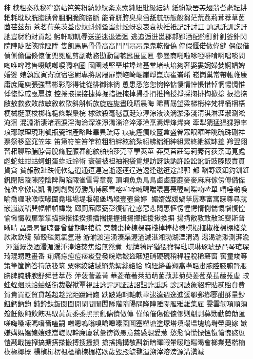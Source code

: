 秣秧租秦秩秘窄窈站笆笑粉紡紗紋紊素索純紐紕級紜納
紙紛缺罟羔翅翁耆耄耘耕耙耗耽耿胱脂胰脅胭胴脆胸胳脈
能脊胼胯臭臬舀舐航舫舨般芻茫荒荔荊茸荐草茵茴荏茲茹
茶茗荀茱茨荃虔蚊蚪蚓蚤蚩蚌蚣蚜衰衷袁袂衽衹記訐討訌
訕訊託訓訖訏訑豈豺豹財貢起躬軒軔軏辱送逆迷退迺迴
逃追逅迸邕郡郝郢酒配酌釘針釗釜釙閃院陣陡陛陝除陘陞
隻飢馬⾺骨⾻高⾼⾾鬥鬲⿀鬼⿁乾偺偽停假偃偌做偉健
偶偎偕偵側偷偏倏偯偭兜冕凰剪副勒務勘動匐匏匙匿區匾
參曼商啪啦啄啞啡啃啊唱啖問啕唯啤唸售啜唬啣唳啁啗圈
國圉域堅堊堆埠埤基堂堵執培夠奢娶婁婉婦婪婀娼婢婚婆
婊孰寇寅寄寂宿密尉專將屠屜屝崇崆崎崛崖崢崑崩崔崙崤
崧崗巢常帶帳帷康庸庶庵庾張強彗彬彩彫得徙從徘御徠徜
恿患悉悠您惋悴惦悽情悻悵惜悼惘惕惆惟悸惚惇戚戛扈掠
控捲掖探接捷捧掘措捱掩掉掃掛捫推掄授掙採掬排掏掀捻
捩捨捺敝敖救教敗啟敏敘敕敔斜斛斬族旋旌旎晝晚晤晨晦
晞曹勗望梁梯梢梓梵桿桶梱梧梗械梃棄梭梆梅梔條梨梟梡
梂欲殺毫毬氫涎涼淳淙液淡淌淤添淺清淇淋涯淑涮淞淹涸
混淵淅淒渚涵淚淫淘淪深淮淨淆淄涪淬涿淦烹焉焊烽烯爽
牽犁猜猛猖猓猙率琅琊球理現琍瓠瓶瓷甜產略畦畢異疏痔
痕疵痊痍皎盔盒盛眷眾眼眶眸眺硫硃硎祥票祭移窒窕笠笨
笛第符笙笞笮粒粗粕絆絃統紮紹紼絀細紳組累終紲紱缽羞
羚翌翎習耜聊聆脯脖脣脫脩脰脤舂舵舷舶船莎莞莘荸莢莖
莽莫莒莊莓莉莠荷荻荼莆莧處彪蛇蛀蚶蛄蚵蛆蛋蚱蚯蛉術
袞袈被袒袖袍袋覓規訪訝訣訥許設訟訛訢豉豚販責貫貨貪
貧赧赦趾趺軛軟這逍通逗連速逝逐逕逞造透逢逖逛途部郭
都酗野釵釦釣釧釭釩閉陪陵陳陸陰陴陶陷陬雀雪雩章竟
頂頃魚⿂鳥⿃鹵⿄鹿⿅麥⿆麻⿇傢傍傅備傑傀傖傘傚最凱
割剴創剩勞勝勛博厥啻喀喧啼喊喝喘喂喜喪喔喇喋喃喳單
喟唾喲喚喻喬喱啾喉喫喙圍堯堪場堤堰報堡堝堠壹壺奠婷
媚婿媒媛媧孳孱寒富寓寐尊尋就嵌嵐崴嵇巽幅帽幀幃幾
廊廁廂廄弼彭復循徨惑惡悲悶惠愜愣惺愕惰惻惴慨惱愎惶
愉愀愒戟扉掣掌描揀揩揉揆揍插揣提握揖揭揮捶援揪換摒
揚揹敞敦敢散斑斐斯普晰晴晶景暑智晾晷曾替期朝棺棕
棠棘棗椅棟棵森棧棹棒棲棣棋棍植椒椎棉棚楮棻款欺欽殘
殖殼毯氮氯氬港游湔渡渲湧湊渠渥渣減湛湘渤湖湮渭渦
湯渴湍渺測湃渝渾滋溉渙湎湣湄湲湩湟焙焚焦焰無然煮
焜牌犄犀猶猥猴猩琺琪琳琢琥琵琶琴琯琛琦琨甥甦畫番
痢痛痣痙痘痞痠登發皖皓皴盜睏短硝硬硯稍稈程稅稀窘窗
窖童竣等策筆筐筒答筍筋筏筑粟粥絞結絨絕紫絮絲絡給
絢絰絳善翔翕耋聒肅腕腔腋腑腎脹腆脾腌腓腴舒舜菩萃菸
萍菠菅萋菁華菱菴著萊菰萌菌菽菲菊萸萎萄菜萇菔菟虛
蛟蛙蛭蛔蛛蛤蛐蛞街裁裂袱覃視註詠評詞証詁詔詛詐詆訴
診訶詖象貂貯貼貳貽賁費賀貴買貶貿貸越超趁跎距跋跚跑
跌跛跆軻軸軼辜逮逵週逸進逶鄂郵鄉郾酣酥量鈔鈕鈣鈉鈞
鈍鈐鈇鈑閔閏開閑間閒閎隊階隋陽隅隆隍陲隄雁雅雄集雇
雯雲韌項順須飧飪飯飩飲飭馮馭黃⿈黍⿉黑⿊亂傭債傲傳
僅傾催傷傻傯僇剿剷剽募勦勤勢勣匯嗟嗨嗓嗦嗎嗜嗇嗑嗣
嗤嗯嗚嗡嗅嗆嗥嗉園圓塞塑塘塗塚塔填塌塭塊塢塒塋奧嫁
嫉嫌媾媽媼媳嫂媲嵩嵯幌幹廉廈弒彙徬微愚意慈感想愛惹
愁愈慎慌慄慍愾愴愧愍愆愷戡戢搓搾搞搪搭搽搬搏搜搔損
搶搖搗搆敬斟新暗暉暇暈暖暄暘暍會榔業楚楷楠楔極椰概
楊楨楫楞楓楹榆楝楣楛歇歲毀殿毓毽溢溯滓溶滂源溝滇滅
